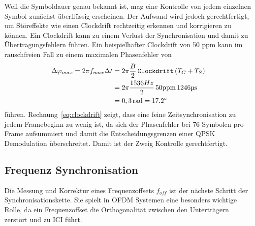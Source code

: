 Weil die Symboldauer genau bekannt ist, mag eine Kontrolle von jedem einzelnen Symbol zunächst überflüssig erscheinen. Der Aufwand wird jedoch gerechtfertigt, um Störeffekte wie einen Clockdrift rechtzeitig erkennen und korrigieren zu können. Ein Clockdrift kann zu einem Verlust der Synchronisation und damit zu Übertragungsfehlern führen.
Ein beispielhafter Clockdrift von 50 ppm kann im rauschfreien Fall zu einem maximalen Phasenfehler von
\begin{equation}
\begin{aligned}
    \Delta\varphi_{max} = 2 \pi f_{max} \Delta t &= 2 \pi \frac{B}{2}\, \texttt{Clockdrift}\, (T_G+T_S) \\
    &=  2 \pi \frac{1536 Hz}{2}\, 50 \text{ppm}\, 1246 \text{\textmu s} \\
    &= 0,3\, \text{rad} = \ang{17,2}
    \end{aligned}
    \label{eq:clockdrift}
\end{equation}
führen. Rechnung~\ref{eq:clockdrift} zeigt, dass eine feine Zeitsynchronisation zu jedem Framebeginn zu wenig ist, da sich der Phasenfehler bei 76 Symbolen pro Frame aufsummiert und damit die Entscheidungsgrenzen einer QPSK Demodulation überschreitet. Damit ist der Zweig \glqq Kontrolle\grqq{} gerechtfertigt.


\subsection{Frequenz Synchronisation}
Die Messung und Korrektur eines Frequenzoffsets $f_{off}$ ist der nächste Schritt der Synchronisationskette. Sie spielt in OFDM Systemen eine besonders wichtige Rolle, da ein Frequenzoffset die Orthogonalität zwischen den Unterträgern zerstört und zu \ac{ICI} führt.

